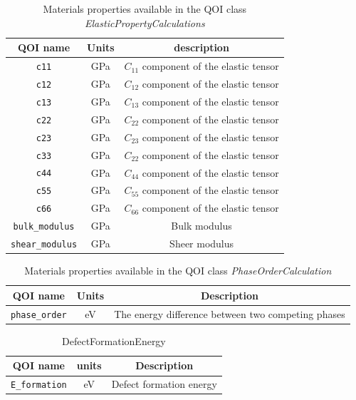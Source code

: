 \begin{table}[ht]
	\centering
	\caption{Materials properties available in the QOI class \emph{ElasticPropertyCalculations}}
	\label{tbl:pypospack_qoi_lmps_elastic}
	\begin{tabular}{ccc}
		\hline
		QOI name & Units &description \\
		\hline
		\verb|c11|
		  & GPa
		  & $C_{11}$ component of the elastic tensor\\
		\verb|c12|
		  & GPa
		  & $C_{12}$ component of the elastic tensor\\
		\verb|c13|
		  & GPa
		  & $C_{13}$ component of the elastic tensor \\
		\verb|c22|
		  & GPa
			& $C_{22}$ component of the elastic tensor \\
		\verb|c23|
			& GPa
			& $C_{23}$ component of the elastic tensor \\
		\verb|c33|
			& GPa
			& $C_{22}$ component of the elastic tensor \\
		\verb|c44|
			& GPa
			& $C_{44}$ component of the elastic tensor \\
		\verb|c55|
			& GPa
			& $C_{55}$ component of the elastic tensor \\
		\verb|c66|
			& GPa
			& $C_{66}$ component of the elastic tensor \\
		\verb|bulk_modulus|
			& GPa
			& Bulk modulus \\
		\verb|shear_modulus|
			& GPa
			& Sheer modulus \\
		\hline
	\end{tabular}
\end{table}

\begin{table}[ht]
	\centering
	\caption{Materials properties available in the QOI class \emph{PhaseOrderCalculation}}
	\label{tbl:pypospack_qoi_lmps_phase_order}
	\begin{tabular}{ccc}
		\hline
		QOI name & Units & Description \\
		\hline
		\verb|phase_order|
		  & eV
			& The energy difference between two competing phases\\
		\hline
	\end{tabular}
\end{table}

\begin{table}[ht]
	\centering
	\caption{DefectFormationEnergy}
	\label{tbl:pypospack_qoi_lmps_defect}
	\begin{tabular}{ccc}
		\hline
		QOI name & units & Description \\
		\hline
		\verb|E_formation|
		 	& eV
			& Defect formation energy\\
		\hline
	\end{tabular}
\end{table}

